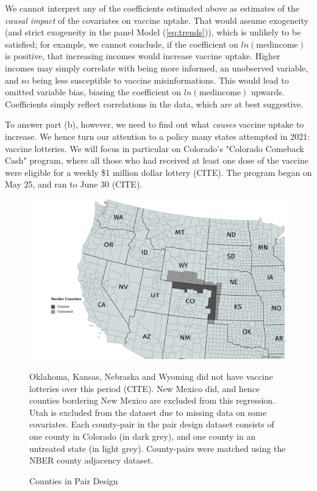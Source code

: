 \documentclass[12pt]{article}
\begin{document}
\begin{spacing}{1.5}
		
		We cannot interpret any of the coefficients estimated above as estimates of the \textit{causal impact} of the covariates on vaccine uptake. That would assume exogeneity (and strict exogeneity in the panel Model (\ref{eq:trends})), which is unlikely to be satisfied; for example, we cannot conclude, if the coefficient on $ln(\textrm{medincome})$ is positive, that increasing incomes would increase vaccine uptake. Higher incomes may simply correlate with being more informed, an unobserved variable, and so being less susceptible to vaccine misinformations. This would lead to omitted variable bias, biasing the coefficient on $ln(\textrm{medincome})$ upwards. Coefficients simply reflect correlations in the data, which are at best suggestive.
		
		To answer part (b), however, we need to find out what \textit{causes} vaccine uptake to increase. We hence turn our attention to a policy many states attempted in 2021: vaccine lotteries. We will focus in particular on Colorado's "Colorado Comeback Cash" program, where all those who had received at least one dose of the vaccine were eligible for a weekly \$1 million dollar lottery (CITE). The program began on May 25, and ran to June 30 (CITE).
		
		\begin{figure}
			\centering
			\includegraphics[width=6in]{../graphs/Border_Counties.png}
			\caption*{\footnotesize{Oklahoma, Kansas, Nebraska and Wyoming did not have vaccine lotteries over this period (CITE). New Mexico did, and hence counties bordering New Mexico are excluded from this regression. Utah is excluded from the dataset due to missing data on some covariates. Each county-pair in the pair design dataset consists of one county in Colorado (in dark grey), and one county in an untreated state (in light grey). County-pairs were matched using the NBER county adjacency dataset.}}
			\caption{Counties in Pair Design}
			\label{fig:bordercounties}
		\end{figure}
		

\end{spacing}
\end{document}
